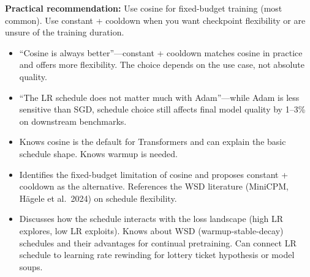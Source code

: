\begin{interviewq}
\textbf{Practical recommendation:} Use cosine for fixed-budget training (most common). Use constant + cooldown when you want checkpoint flexibility or are unsure of the training duration.

\redflags
\begin{itemize}
    \item ``Cosine is always better''---constant + cooldown matches cosine in practice and offers more flexibility. The choice depends on the use case, not absolute quality.
    \item ``The LR schedule does not matter much with Adam''---while Adam is less sensitive than SGD, schedule choice still affects final model quality by 1--3\% on downstream benchmarks.
\end{itemize}


\goodgreat
\begin{itemize}
    \item {} Knows cosine is the default for Transformers and can explain the basic schedule shape. Knows warmup is needed.
    \item {} Identifies the fixed-budget limitation of cosine and proposes constant + cooldown as the alternative. References the WSD literature (MiniCPM, H\"{a}gele et al.\ 2024) on schedule flexibility.
    \item {} Discusses how the schedule interacts with the loss landscape (high LR explores, low LR exploits). Knows about WSD (warmup-stable-decay) schedules and their advantages for continual pretraining. Can connect LR schedule to learning rate rewinding for lottery ticket hypothesis or model soups.
\end{itemize}

\end{interviewq}

